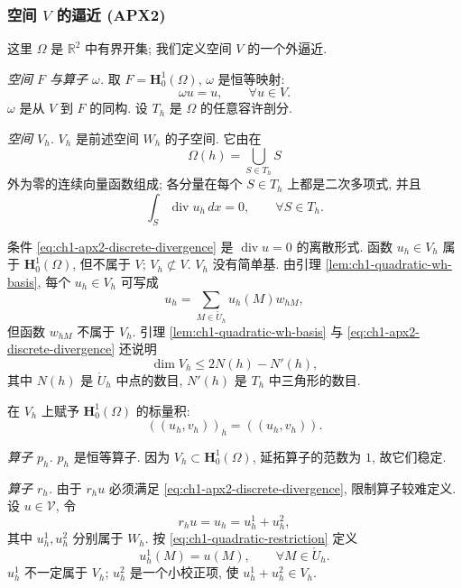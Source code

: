\subsubsection{空间 \texorpdfstring{$V$}{V} 的逼近 (APX2)}
\label{subsubsec:ch1-v-apx2}

这里 $\Omega$ 是 $\mathbb R^2$ 中有界开集; 我们定义空间 $V$ 的一个外逼近.

\emph{空间 $F$ 与算子 $\omega$.} 取 $F=\mathbf H_0^1(\Omega)$, $\omega$ 是恒等映射:
\begin{equation}
\omega u=u,\qquad\forall u\in V.
\label{eq:ch1-apx2-omega}
\end{equation}
$\omega$ 是从 $V$ 到 $F$ 的同构. 设 $T_h$ 是 $\Omega$ 的任意容许剖分.

\emph{空间 $V_h$.} $V_h$ 是前述空间 $W_h$ 的子空间. 它由在
\begin{equation}
\Omega(h)=\bigcup_{S\in T_h}S
\label{eq:ch1-apx2-domain}
\end{equation}
外为零的连续向量函数组成; 各分量在每个 $S\in T_h$ 上都是二次多项式, 并且
\begin{equation}
\int_S\operatorname{div}u_h\,dx=0,
\qquad\forall S\in T_h.
\label{eq:ch1-apx2-discrete-divergence}
\end{equation}

条件 \eqref{eq:ch1-apx2-discrete-divergence} 是 $\operatorname{div}u=0$ 的离散形式. 函数 $u_h\in V_h$ 属于 $\mathbf H_0^1(\Omega)$, 但不属于 $V$; $V_h\not\subset V$. $V_h$ 没有简单基. 由引理 \ref{lem:ch1-quadratic-wh-basis}, 每个 $u_h\in V_h$ 可写成
\[
u_h=\sum_{M\in\mathring U_h}u_h(M)w_{hM},
\]
但函数 $w_{hM}$ 不属于 $V_h$. 引理 \ref{lem:ch1-quadratic-wh-basis} 与 \eqref{eq:ch1-apx2-discrete-divergence} 还说明
\[
\dim V_h\leq2N(h)-N'(h),
\]
其中 $N(h)$ 是 $\mathring U_h$ 中点的数目, $N'(h)$ 是 $T_h$ 中三角形的数目.

在 $V_h$ 上赋予 $\mathbf H_0^1(\Omega)$ 的标量积:
\begin{equation}
((u_h,v_h))_h=((u_h,v_h)).
\label{eq:ch1-apx2-inner-product}
\end{equation}

\emph{算子 $p_h$.} $p_h$ 是恒等算子. 因为 $V_h\subset\mathbf H_0^1(\Omega)$, 延拓算子的范数为 $1$, 故它们稳定.

\emph{算子 $r_h$.} 由于 $r_hu$ 必须满足 \eqref{eq:ch1-apx2-discrete-divergence}, 限制算子较难定义. 设 $u\in\mathcal V$, 令
\begin{equation}
r_hu=u_h=u_h^1+u_h^2,
\label{eq:ch1-apx2-restriction-split}
\end{equation}
其中 $u_h^1,u_h^2$ 分别属于 $W_h$. 按 \eqref{eq:ch1-quadratic-restriction} 定义
\begin{equation}
u_h^1(M)=u(M),\qquad\forall M\in\mathring U_h.
\label{eq:ch1-apx2-primary-interpolant}
\end{equation}
$u_h^1$ 不一定属于 $V_h$; $u_h^2$ 是一个小校正项, 使 $u_h^1+u_h^2\in V_h$.

